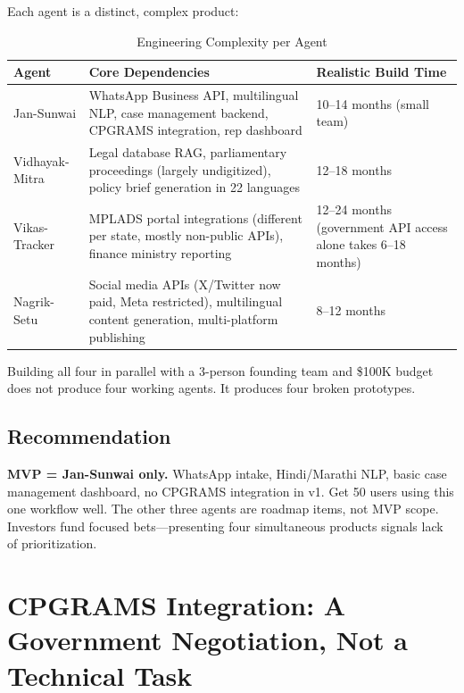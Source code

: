 \documentclass[12pt, a4paper]{article}
\begin{document}
Each agent is a distinct, complex product:

\begin{table}[h!]
\centering
\caption{Engineering Complexity per Agent}
\renewcommand{\arraystretch}{1.3}
\begin{tabularx}{\textwidth}{lXX}
\toprule
\rowcolor{rowblue}
\textbf{Agent} & \textbf{Core Dependencies} & \textbf{Realistic Build Time} \\
\midrule
Jan-Sunwai & WhatsApp Business API, multilingual NLP, case management backend, CPGRAMS integration, rep dashboard & 10--14 months (small team) \\
\midrule
Vidhayak-Mitra & Legal database RAG, parliamentary proceedings (largely undigitized), policy brief generation in 22 languages & 12--18 months \\
\midrule
Vikas-Tracker & MPLADS portal integrations (different per state, mostly non-public APIs), finance ministry reporting & 12--24 months (government API access alone takes 6--18 months) \\
\midrule
Nagrik-Setu & Social media APIs (X/Twitter now paid, Meta restricted), multilingual content generation, multi-platform publishing & 8--12 months \\
\bottomrule
\end{tabularx}
\end{table}

Building all four in parallel with a 3-person founding team and \$100K budget does not produce four working agents. It produces four broken prototypes.

\subsection{Recommendation}
\textbf{MVP = Jan-Sunwai only.} WhatsApp intake, Hindi/Marathi NLP, basic case management dashboard, no CPGRAMS integration in v1. Get 50 users using this one workflow well. The other three agents are roadmap items, not MVP scope. Investors fund focused bets---presenting four simultaneous products signals lack of prioritization.

\newpage

\section{CPGRAMS Integration: A Government Negotiation, Not a Technical Task}
\end{document}
